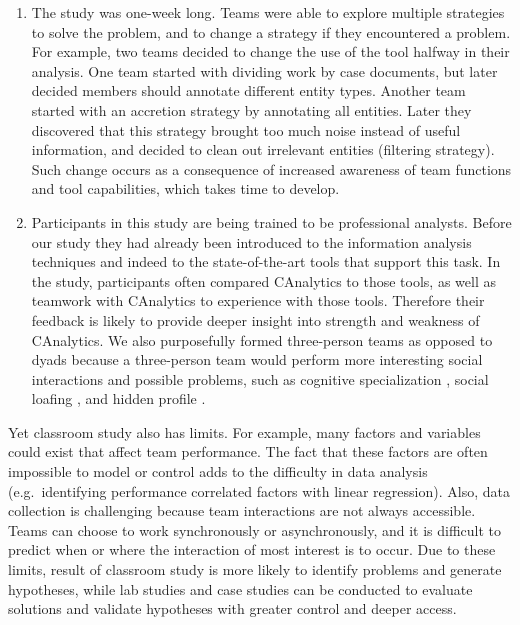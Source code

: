 \documentclass[]{article}
\begin{document}
\begin{enumerate}
\def\labelenumi{\arabic{enumi}.}
\item
  The study was one-week long. Teams were able to explore multiple
  strategies to solve the problem, and to change a strategy if they
  encountered a problem. For example, two teams decided to change the
  use of the tool halfway in their analysis. One team started with
  dividing work by case documents, but later decided members should
  annotate different entity types. Another team started with an
  accretion strategy by annotating all entities. Later they discovered
  that this strategy brought too much noise instead of useful
  information, and decided to clean out irrelevant entities (filtering
  strategy). Such change occurs as a consequence of increased awareness
  of team functions and tool capabilities, which takes time to develop.
\item
  Participants in this study are being trained to be professional
  analysts. Before our study they had already been introduced to the
  information analysis techniques and indeed to the state-of-the-art
  tools that support this task. In the study, participants often
  compared CAnalytics to those tools, as well as teamwork with
  CAnalytics to experience with those tools. Therefore their feedback is
  likely to provide deeper insight into strength and weakness of
  CAnalytics. We also purposefully formed three-person teams as opposed
  to dyads because a three-person team would perform more interesting
  social interactions and possible problems, such as cognitive
  specialization \autocite{Borge2014}, social loafing
  \autocite{Karau1993}, and hidden profile \autocite{Stasser2003b}.
\end{enumerate}

Yet classroom study also has limits. For example, many factors and
variables could exist that affect team performance. The fact that these
factors are often impossible to model or control adds to the difficulty
in data analysis (e.g.~identifying performance correlated factors with
linear regression). Also, data collection is challenging because team
interactions are not always accessible. Teams can choose to work
synchronously or asynchronously, and it is difficult to predict when or
where the interaction of most interest is to occur. Due to these limits,
result of classroom study is more likely to identify problems and
generate hypotheses, while lab studies and case studies can be conducted
to evaluate solutions and validate hypotheses with greater control and
deeper access.
\end{document}

